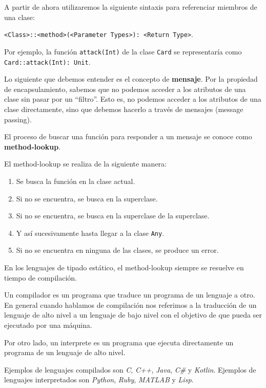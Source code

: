   \begin{note}
    A partir de ahora utilizaremos la siguiente sintaxis para referenciar miembros de una clase:
    
    \texttt{<Class>::<method>(<Parameter Types>): <Return Type>}.
    
    Por ejemplo, la función \texttt{attack(Int)} de la clase \texttt{Card} se representaría como
    \texttt{Card::attack(Int): Unit}.
  \end{note}

  Lo siguiente que debemos entender es el concepto de \textbf{mensaje}.
  Por la propiedad de encapsulamiento, sabemos que no podemos acceder a los 
  atributos de una clase sin pasar por un \enquote{filtro}.
  Esto es, no podemos acceder a los atributos de una clase directamente, sino que debemos hacerlo
  a través de mensajes (message passing).

  \begin{defaultbox}
    El proceso de buscar una función para responder a un mensaje se conoce como 
    \textbf{method-lookup}.

    El method-lookup se realiza de la siguiente manera:
    \begin{enumerate}
      \item Se busca la función en la clase actual.
      \item Si no se encuentra, se busca en la superclase.
      \item Si no se encuentra, se busca en la superclase de la superclase.
      \item Y así sucesivamente hasta llegar a la clase \texttt{Any}.
      \item Si no se encuentra en ninguna de las clases, se produce un error.
    \end{enumerate}
    
    En los lenguajes de tipado estático, el method-lookup siempre se resuelve en tiempo de 
    compilación.
  \end{defaultbox}

  \begin{note}
    Un compilador es un programa que traduce un programa de un lenguaje a otro.
    En general cuando hablamos de compilación nos referimos a la traducción de un lenguaje de alto 
    nivel a un lenguaje de bajo nivel con el objetivo de que pueda ser ejecutado por una máquina.
    
    Por otro lado, un interprete es un programa que ejecuta directamente un 
    programa de un lenguaje de alto nivel.

    Ejemplos de lenguajes compilados son \textit{C}, \textit{C++}, \textit{Java}, \textit{C\#} y
    \textit{Kotlin}.
    Ejemplos de lenguajes interpretados son \textit{Python}, \textit{Ruby}, \textit{MATLAB} y
    \textit{Lisp}.
  \end{note}

